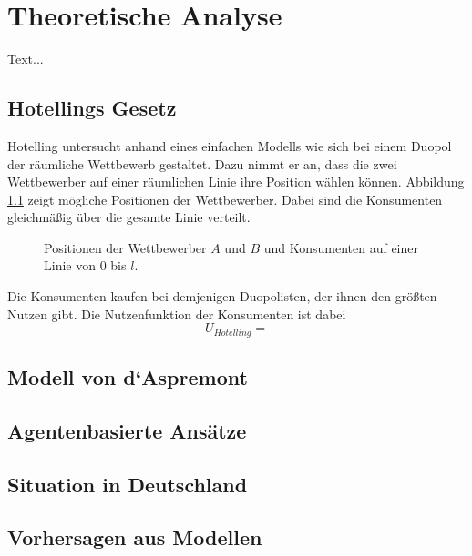 \chapter{Theoretische Analyse}\label{Kap-Theorie}

\noindent
Text...

\section{Hotellings Gesetz}\label{Sec-Hotelling}

Hotelling \citep{hotelling1929} untersucht anhand eines einfachen Modells wie sich bei einem Duopol der räumliche Wettbewerb gestaltet. Dazu nimmt er an, dass die zwei Wettbewerber auf einer räumlichen Linie ihre Position wählen können. Abbildung \ref{Fig-Linearer-Wettbewerb} zeigt mögliche Positionen der Wettbewerber. Dabei sind die Konsumenten gleichmäßig über die gesamte Linie verteilt.

\begin{figure}[htb]
	\centering
	\caption{Positionen der Wettbewerber $A$ und $B$ und Konsumenten auf einer Linie von $0$ bis $l$.}
	\label{Fig-Linearer-Wettbewerb}
\end{figure}

Die Konsumenten kaufen bei demjenigen Duopolisten, der ihnen den größten Nutzen gibt. Die Nutzenfunktion der Konsumenten ist dabei
\begin{equation}
U_{Hotelling} = 
\end{equation}

\section{Modell von d‘Aspremont}\label{Sec-Aspremont}

\section{Agentenbasierte Ansätze}\label{Sec-ABM}

\section{Situation in Deutschland}\label{Sec-Deutschland}

\section{Vorhersagen aus Modellen}\label{Sec-Vorhersagen}
